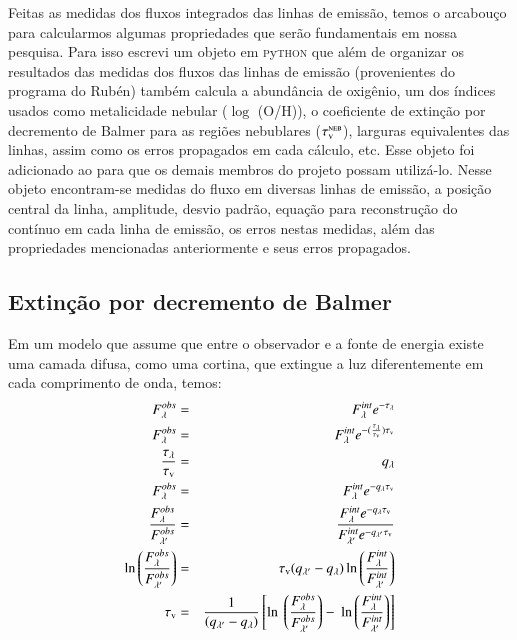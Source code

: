 Feitas as medidas dos fluxos integrados das linhas de emissão, temos o arcabouço para calcularmos
algumas propriedades que serão fundamentais em nossa pesquisa. Para isso escrevi um objeto em
\textsc{p}y\textsc{thon} que além de organizar os resultados das medidas dos fluxos das linhas de
emissão (provenientes do programa do Rubén) também calcula a abundância de oxigênio, um dos índices
usados como metalicidade nebular ($\log$ (O/H)), o coeficiente de extinção por decremento de Balmer
para as regiões nebublares ($\tau_{\mathrm{\textsc{v}}}^{\mathrm{\textsc{neb}}}$), larguras equivalentes das linhas, assim como os erros
propagados em cada cálculo, etc. Esse objeto foi adicionado ao \pycasso
\citep{CidFernandes.etal.2013a} para que os demais membros do projeto possam utilizá-lo. Nesse
objeto encontram-se medidas do fluxo em diversas linhas de emissão, a posição central da linha,
amplitude, desvio padrão, equação para reconstrução do contínuo em cada linha de emissão, os erros
nestas medidas, além das propriedades mencionadas anteriormente e seus erros propagados.

\subsection{Extinção por decremento de Balmer}
\label{sec:emline:datacube:tauvneb}

Em um modelo que assume que entre o observador e a fonte de energia existe uma
camada difusa, como uma cortina, que extingue a luz diferentemente em cada comprimento de
onda, temos:
\begin{eqnarray}
   F_\lambda^{obs} &=& F_\lambda^{int} e^{-\tau_\lambda} \\
   F_\lambda^{obs} &=& F_\lambda^{int} e^{-(\frac{\tau_\lambda}{\tauV}) \tauV} \\
   \frac{\tau_\lambda}{\tauV} &=& q_\lambda \\
   F_\lambda^{obs} &=& F_\lambda^{int} e^{-q_\lambda \tauV} \\
   \frac{F_\lambda^{obs}}{F_{\lambda^\prime}^{obs}} &=& \
 \frac{F_\lambda^{int} e^{-q_\lambda \tauV}}{F_{\lambda^\prime}^{int} e^{-q_{\lambda^\prime} \tauV}} \\
   \ln \left(\frac{F_\lambda^{obs}}{F_{\lambda^\prime}^{obs}}\right) &=& \
 \tauV (q_{\lambda^\prime} - q_\lambda) \ln \left(\frac{F_\lambda^{int}}{F_{\lambda^\prime}^{int}}\right) \\
   \tauV &=& \frac{1}{(q_{\lambda^\prime} - q_\lambda)} \left[\ln \ 
 \left(\frac{F_\lambda^{obs}}{F_{\lambda^\prime}^{obs}}\right) - \
 \ln \left(\frac{F_\lambda^{int}}{F_{\lambda^\prime}^{int}}\right)\right] 
\end{eqnarray}


